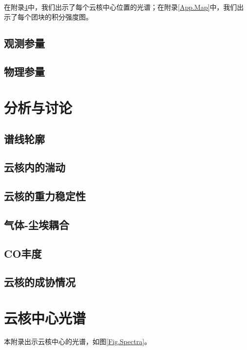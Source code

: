 \documentclass[UTF8, nocolorlinks]{pkuthss}
\begin{document}
		在附录\ref{App.Spectra}中，我们出示了每个云核中心位置的光谱；在附录\ref{App.Map}中，我们出示了每个团块的积分强度图。

	\section{观测参量}



	\section{物理参量}

\chapter{分析与讨论}
	\section{谱线轮廓}
	\section{云核内的湍动}
	\section{云核的重力稳定性}
	\section{气体-尘埃耦合}
	\section{CO丰度}
	\section{云核的成协情况}

\appendix %

\printbibliography[ %
		heading = bibintoc,
	]
\chapter{云核中心光谱}\label{App.Spectra}
	本附录出示云核中心的光谱，如图\ref{Fig.Spectra}。
\end{document}
